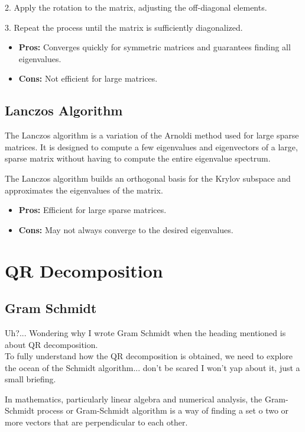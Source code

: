 \documentclass[article]{IEEEtran}
\numberwithin{equation}{enumi}
\numberwithin{figure}{enumi}
\begin{document}
2. Apply the rotation to the matrix, adjusting the off-diagonal elements.

3. Repeat the process until the matrix is sufficiently diagonalized.

\begin{itemize}
    \item \textbf{Pros:} Converges quickly for symmetric matrices and guarantees finding all eigenvalues.
    \item \textbf{Cons:} Not efficient for large matrices.
\end{itemize}

\subsection{Lanczos Algorithm}
The Lanczos algorithm is a variation of the Arnoldi method used for large sparse matrices. It is designed to compute a few eigenvalues and eigenvectors of a large, sparse matrix without having to compute the entire eigenvalue spectrum.

The Lanczos algorithm builds an orthogonal basis for the Krylov subspace and approximates the eigenvalues of the matrix.

\begin{itemize}
    \item \textbf{Pros:} Efficient for large sparse matrices.
    \item \textbf{Cons:} May not always converge to the desired eigenvalues.
\end{itemize}

\section{QR Decomposition}
\subsection{Gram Schmidt}
Uh?... Wondering why I wrote Gram Schmidt when the heading mentioned is about QR decomposition.\\
To fully understand how the QR decomposition is obtained, we need to explore the ocean of the Schmidt algorithm... don't be scared I won't yap about it, just a small briefing. 

In mathematics, particularly linear algebra and numerical analysis, the Gram-Schmidt process or Gram-Schmidt algorithm is a way of finding a set o two or more vectors that are perpendicular to each other.
\end{document}
